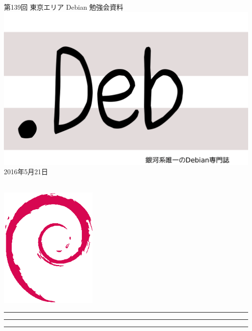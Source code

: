 \documentclass[mingoth,a4paper]{jsarticle}
\newcommand{\debmtgyear}{2016}
\newcommand{\debmtgmonth}{5}
\newcommand{\debmtgdate}{21}
\newcommand{\debmtgnumber}{139}
\begin{document}
\begin{titlepage}
\thispagestyle{empty}

\vspace*{-2cm}
第\debmtgnumber{}回 東京エリア Debian 勉強会資料\\
\hspace*{-2cm}
\includegraphics{image2012-natsu/dotdeb.pdf}\\
\hfill{}\debmtgyear{}年\debmtgmonth{}月\debmtgdate{}日

\\

\vspace*{-2cm}
\hfill{}\includegraphics[height=6cm]{image200502/openlogo-nd.eps}
\end{titlepage}

\newpage

\begin{minipage}[b]{0.2\hsize}
 \colorbox{titleback}{}
\end{minipage}
\begin{minipage}[b]{0.8\hsize}
\hrule
\vspace{2mm}
\hrule
\begin{multicols}{2}
\tableofcontents
\end{multicols}
\vspace{2mm}
\hrule
\end{minipage}
\end{document}
